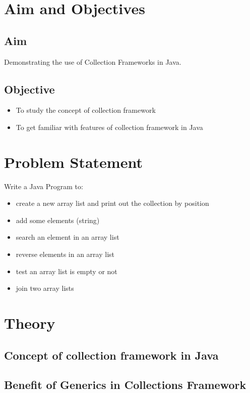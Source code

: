 \documentclass[11pt]{article}
\begin{document}
\tableofcontents
\thispagestyle{empty}
\clearpage


\setcounter{page}{1}

\section{Aim and Objectives}
\subsection*{Aim}
Demonstrating the use of Collection Frameworks in Java.
\subsection*{Objective}
\begin{itemize}
	\item To study the concept of collection framework
	\item To get familiar with features of collection framework in Java
\end{itemize}
\section{Problem Statement}
Write a Java Program to: 
\begin{itemize}
	\item create a new array list and print out the collection by position
	\item add some elements (string)
	\item search an element in an array list
	\item reverse elements in an array list
	\item test an array list is empty or not
	\item join two array lists
\end{itemize}
	
\section{Theory}
\subsection{Concept of collection framework in Java}

\subsection{Benefit of Generics in Collections Framework}
\end{document}
